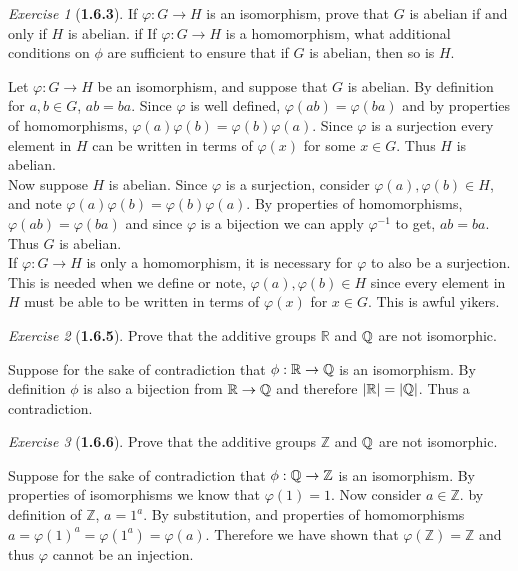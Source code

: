 \documentclass[12pt]{amsart}
\makeatletter
\theoremstyle{remark}
\newtheorem*{exercise}{Exercise}%
\def\RR{\ensuremath{\mathbb R}} %
\def\ZZ{\ensuremath{\mathbb Z}}
\def\QQ{{\ensuremath\mathbb Q}}
\renewenvironment{proof}[1][\proofname]{\par\doublespacing
  \pushQED{\qed}%
  \normalfont \topsep6\p@\@plus6\p@\relax
  \list{}{%
    \settowidth{\leftmargin}{\itshape\proofname:\hskip\labelsep}%
    \setlength{\labelwidth}{0pt}%
    \setlength{\itemindent}{-\leftmargin}%
  }%
  \item[\hskip\labelsep\itshape#1\@addpunct{:}]\ignorespaces
}{%
  \popQED\endlist\@endpefalse
  \singlespacing
}
\theoremstyle{mycomment}
\makeatother
\begin{document}
\begin{exercise}[\textbf{1.6.3}]If $\varphi: G \to H$ is an isomorphism, prove that $G$ is abelian if and only if $H$ is abelian. 
  if If $\varphi: G \to H$ is a homomorphism, what additional conditions on $\phi$ are sufficient to ensure that if $G$ is abelian, then so is $H$.\\
  \begin{proof} Let $\varphi: G \to H$ be an isomorphism, and suppose that $G$ is abelian. By definition for $a, b \in G$, $ab = ba$. Since $\varphi$ is 
    well defined, $\varphi(ab) = \varphi(ba)$ and by properties of homomorphisms, $\varphi(a)\varphi(b) = \varphi(b)\varphi(a)$. Since $\varphi$ is a surjection 
    every element in $H$ can be written in terms of $\varphi(x)$ for some $x \in G$. Thus $H$ is abelian.\\

    Now suppose $H$ is abelian. Since $\varphi$ is a surjection, consider $\varphi(a), \varphi(b) \in H$, and note $\varphi(a)\varphi(b) = \varphi(b)\varphi(a)$. By properties of homomorphisms, $\varphi(ab) = \varphi(ba)$
    and since $\varphi$ is a bijection we can apply $\varphi^{-1}$ to get, $ab = ba$. Thus $G$ is abelian.\\

    If $\varphi: G \to H$ is only a homomorphism, it is necessary for $\varphi$ to also be a surjection. This is needed when we define or note, $\varphi(a), \varphi(b) \in H$
    since every element in $H$ must be able to be written in terms of $\varphi(x)$ for $x \in G$. 
    This is awful yikers. 
  \end{proof} 
\end{exercise}
\vspace{.15in}

\begin{exercise}[\textbf{1.6.5}] Prove that the additive groups $\RR$ and $\QQ$ are not isomorphic.\\
  \begin{proof} Suppose for the sake of contradiction that $\phi: \RR \to \QQ$ is an isomorphism. By definition $\phi$ is also a bijection 
    from $\RR \to \QQ$ and therefore $|\RR| = |\QQ|$. Thus a contradiction. 
  \end{proof}
\end{exercise}
\vspace{.15in}


\begin{exercise}[\textbf{1.6.6}] Prove that the additive groups $\ZZ$ and $\QQ$ are not isomorphic.\\
  \begin{proof} Suppose for the sake of contradiction that $\phi: \QQ \to \ZZ$ is an isomorphism. By properties of isomorphisms we know that $\varphi(1) = 1$. Now consider $a \in \ZZ$. 
    by definition of $\ZZ$, $a = 1^a$. By substitution, and properties of homomorphisms $a = \varphi(1)^a = \varphi(1^a) = \varphi(a)$. Therefore we have shown that $\varphi(\ZZ) = \ZZ$ and thus 
    $\varphi$ cannot be an injection. 
  \end{proof}
\end{exercise}
\vspace{.15in}
\end{document}
